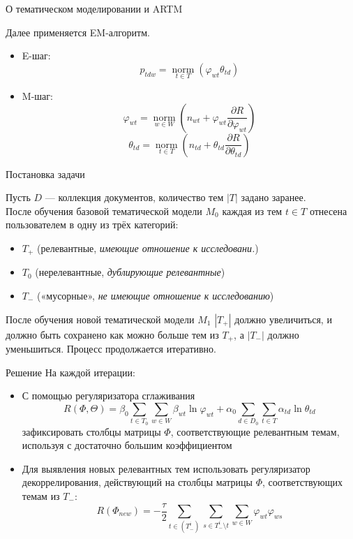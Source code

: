 \documentclass{beamer}
\DeclareMathOperator*{\norm}{\text{norm}}
\begin{document}
\begin{frame}{О тематическом моделировании и ARTM}

Далее применяется EM-алгоритм.

\begin{itemize}
    \item E-шаг:
    $$p_{tdw} = \norm \limits_{t \in T} (\varphi_{wt} \theta_{td})$$
    \item M-шаг: 
    $$
    \varphi_{wt} = \norm \limits_{w \in W} (n_{wt} + \varphi_{wt} \frac{\partial R}{\partial \varphi_{wt}})
    $$
    $$
    \theta_{td} = \norm \limits_{t \in T} (n_{td} + \theta_{td} \frac{\partial R}{\partial \theta_{td}})
    $$
\end{itemize}

\end{frame}
\begin{frame}{Постановка задачи}

Пусть $D$ — коллекция документов, количество тем $|T|$ задано заранее. \\
После обучения базовой тематической модели $M_0$ каждая из тем $t \in T$ отнесена пользователем в одну из трёх категорий:
\begin{itemize}
    \item $T_+$ (релевантные, \textit{имеющие отношение к исследовани.})
    \item $T_0$ (нерелевантные, \textit{дублирующие релевантные})
    \item $T_-$ («мусорные», \textit{не имеющие отношение к исследованию})
\end{itemize}
После обучения новой тематической модели $M_1$ $|T_+|$ должно увеличиться, и должно быть сохранено как можно больше тем из $T_+$, а $|T_-|$ должно уменьшиться. Процесс продолжается итеративно.

\end{frame}
\begin{frame}{Решение}
На каждой итерации:
\begin{itemize}
    \item С помощью регуляризатора сглаживания
    $$R (\Phi, \Theta) = \beta_0 \sum \limits_{t \in T_0} \sum \limits_{w \in W} \beta_{wt} \ln \varphi_{wt} + \alpha_0 \sum \limits_{d \in D_0} \sum \limits_{t \in T} \alpha_{td} \ln \theta_{td}$$
    зафиксировать столбцы матрицы $\Phi$, соответствующие релевантным темам, используя с достаточно большим коэффициентом
    \item Для выявления новых релевантных тем использовать регуляризатор декоррелирования, действующий на столбцы матрицы $\Phi$, соответствующих темам из $T_-$:
        $$R (\Phi_{new}) = -\frac{\tau}{2} \sum \limits_{t \in (T_-^i)} \sum \limits_{s \in T_-^i \setminus t} \sum \limits_{w \in W} \varphi_{wt} \varphi_{ws}$$
\end{itemize}
\end{frame}
\end{document}
